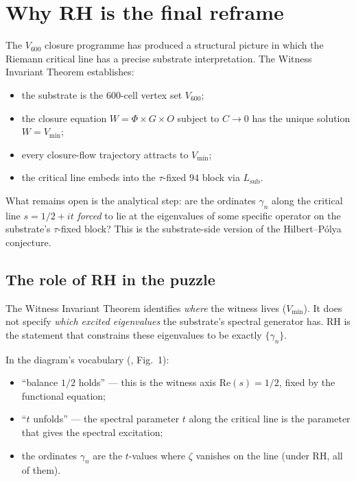 \documentclass[11pt,a4paper]{article}
\newcommand{\Vsix}{V_{600}}
\newcommand{\Vmin}{V_{\min}}
\newcommand{\Lsub}{L_{\mathrm{sub}}}
\newcommand{\Wit}{W}
\begin{document}
\bigskip

\tableofcontents

\newpage

\section{Why RH is the final reframe}
\label{sec:intro}

The $\Vsix$ closure programme has produced a structural picture
in which the Riemann critical line has a precise substrate
interpretation. The Witness Invariant Theorem
\cite{observerAttractor} establishes:

\begin{itemize}[leftmargin=*]
  \item the substrate is the $600$-cell vertex set $\Vsix$;
  \item the closure equation
        $\Wit = \Phi \times G \times O$ subject to $C \to 0$
        has the unique solution $\Wit = \Vmin$;
  \item every closure-flow trajectory attracts to $\Vmin$;
  \item the critical line embeds into the $\tau$-fixed $94$
        block via $\Lsub$.
\end{itemize}

What remains open is the analytical step: are the ordinates
$\gamma_n$ along the critical line $s = 1/2 + it$
\emph{forced} to lie at the eigenvalues of some specific operator
on the substrate's $\tau$-fixed block? This is the substrate-side
version of the Hilbert--P\'olya conjecture.

\subsection{The role of RH in the puzzle}

The Witness Invariant Theorem identifies \emph{where} the witness
lives ($\Vmin$). It does not specify \emph{which excited
eigenvalues} the substrate's spectral generator has. RH is the
statement that constrains these eigenvalues to be exactly
$\{\gamma_n\}$.

In the diagram's vocabulary (\cite{observerAttractor}, Fig.~1):
\begin{itemize}[leftmargin=*]
  \item ``balance $1/2$ holds'' --- this is the witness axis
        $\mathrm{Re}(s) = 1/2$, fixed by the functional equation;
  \item ``$t$ unfolds'' --- the spectral parameter $t$ along the
        critical line is the parameter that gives the spectral
        excitation;
  \item the ordinates $\gamma_n$ are the $t$-values
        where $\zeta$ vanishes on the line (under RH, all of them).
\end{itemize}
\end{document}
